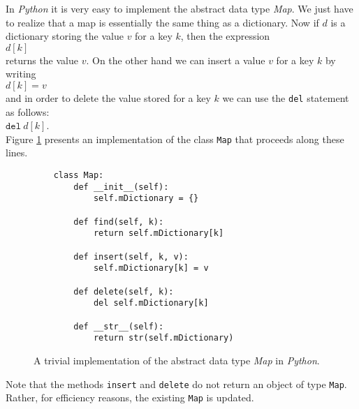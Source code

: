 In \textsl{Python} it is very easy to implement the abstract data type  \textsl{Map}.  We just have
to realize that a map is essentially the same thing as a dictionary.
Now if $d$ is a dictionary storing the value $v$ for a key $k$, then the expression
\\[0.2cm]
\hspace*{1.3cm} $d[k]$
\\[0.2cm]
returns the value $v$.  On the other hand we can insert a value $v$ for a key $k$ by
writing
\\[0.2cm]
\hspace*{1.3cm}
$d[k] = v$ 
\\[0.2cm]
and in order to delete the value stored for a key  $k$ we can use the \texttt{del} statement
as follows: \\[0.2cm]
\hspace*{1.3cm} $\texttt{del}\ d[k]$. \\[0.2cm]
Figure  \ref{fig:Map-Trivial.ipynb} presents an implementation of the class \texttt{Map} that proceeds along
these lines.


\begin{figure}[!ht]
  \centering
\begin{verbatim}
    class Map:
        def __init__(self):
            self.mDictionary = {}
        
        def find(self, k):
            return self.mDictionary[k]
        
        def insert(self, k, v):
            self.mDictionary[k] = v
            
        def delete(self, k):
            del self.mDictionary[k]
            
        def __str__(self):
            return str(self.mDictionary)
\end{verbatim}
\vspace*{-0.3cm}
  \caption{A trivial implementation of the abstract data type \textsl{Map} in \textsl{Python}.}
  \label{fig:Map-Trivial.ipynb}
\end{figure} 
Note that the methods \texttt{insert} and \texttt{delete} do not return an object of type \texttt{Map}.  Rather, for
efficiency reasons, the existing \texttt{Map} is updated.


